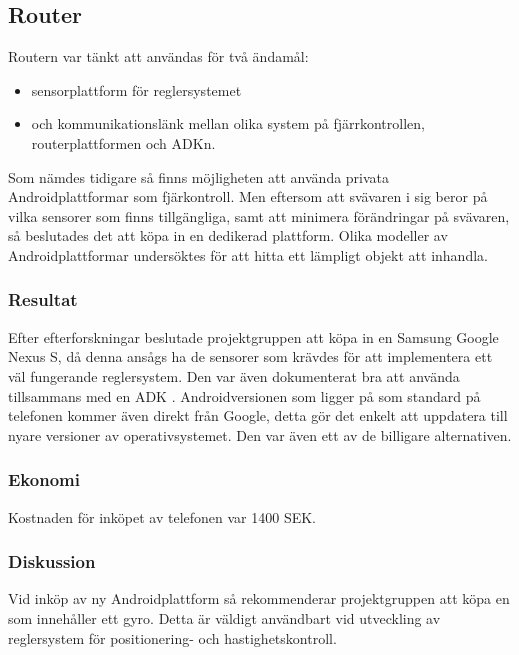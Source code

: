 \subsection{Router}
Routern var tänkt att användas för två ändamål:
\begin{itemize}
\item sensorplattform för reglersystemet
\item och kommunikationslänk mellan olika system på fjärrkontrollen,
routerplattformen och ADKn.
\end{itemize}

Som nämdes tidigare så finns möjligheten att använda privata
Androidplattformar som fjärkontroll. Men eftersom att svävaren i sig beror
på vilka sensorer som finns tillgängliga, samt att minimera förändringar på
svävaren, så beslutades det att köpa in en dedikerad plattform. Olika modeller
av Androidplattformar undersöktes för att hitta ett lämpligt objekt att inhandla.

\subsubsection{Resultat}
Efter efterforskningar beslutade projektgruppen att köpa in en Samsung Google
Nexus S, då denna ansågs ha de sensorer som krävdes för att implementera ett väl
fungerande reglersystem. Den var även dokumenterat bra att använda tillsammans
med en ADK \cite[Supported Android Devices]{Android ADK Arduino}.
Androidversionen som ligger på som standard på telefonen kommer även direkt
från Google, detta gör det enkelt att uppdatera till nyare versioner av
operativsystemet. Den var även ett av de billigare alternativen.

\subsubsection{Ekonomi}
Kostnaden för inköpet av telefonen var 1400 SEK. 

\subsubsection{Diskussion}
Vid inköp av ny Androidplattform så rekommenderar projektgruppen att köpa en som
innehåller ett gyro. Detta är väldigt användbart vid utveckling av reglersystem
för positionering- och hastighetskontroll.
